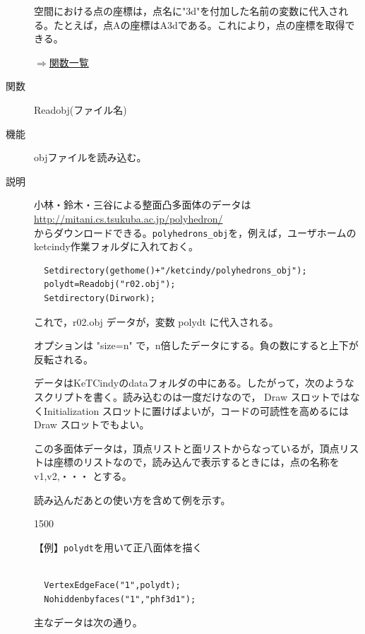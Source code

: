\documentclass[papersize,a4paper,12pt,uplatex]{jsarticle}
\begin{document}
\begin{description}
  空間における点の座標は，点名に"3d"を付加した名前の変数に代入される。たとえば，点Aの座標はA3dである。これにより，点の座標を取得できる。

\begin{flushright} \hyperlink{functionlist}{$\Rightarrow$関数一覧}\end{flushright}

\vspace{\baselineskip}
\hypertarget{readobj}{}
\item[関数]  Readobj(ファイル名)
\item[機能]  objファイルを読み込む。
\item[説明]  小林・鈴木・三谷による整面凸多面体のデータは\\
\hspace*{20mm}\url{http://mitani.cs.tsukuba.ac.jp/polyhedron/}\\
からダウンロードできる。\verb|polyhedrons_obj|を，例えば，ユーザホームのketcindy作業フォルダに入れておく。
\begin{verbatim}
  Setdirectory(gethome()+"/ketcindy/polyhedrons_obj");
  polydt=Readobj("r02.obj");
  Setdirectory(Dirwork);
\end{verbatim}
これで，r02.obj データが，変数 polydt に代入される。

オプションは "size=n"  で，n倍したデータにする。負の数にすると上下が反転される。

データはKeTCindyのdataフォルダの中にある。したがって，次のようなスクリプトを書く。読み込むのは一度だけなので， Draw スロットではなくInitialization スロットに置けばよいが，コードの可読性を高めるには Draw スロットでもよい。

この多面体データは，頂点リストと面リストからなっているが，頂点リストは座標のリストなので，読み込んで表示するときには，点の名称を v1,v2,・・・ とする。

読み込んだあとの使い方を含めて例を示す。

\begin{layer}{150}{0}
\end{layer}


\vspace{\baselineskip}
【例】\verb|polydt|を用いて正八面体を描く


\begin{verbatim}

  VertexEdgeFace("1",polydt);
  Nohiddenbyfaces("1","phf3d1");
\end{verbatim}

主なデータは次の通り。


\end{description}
\end{document}
